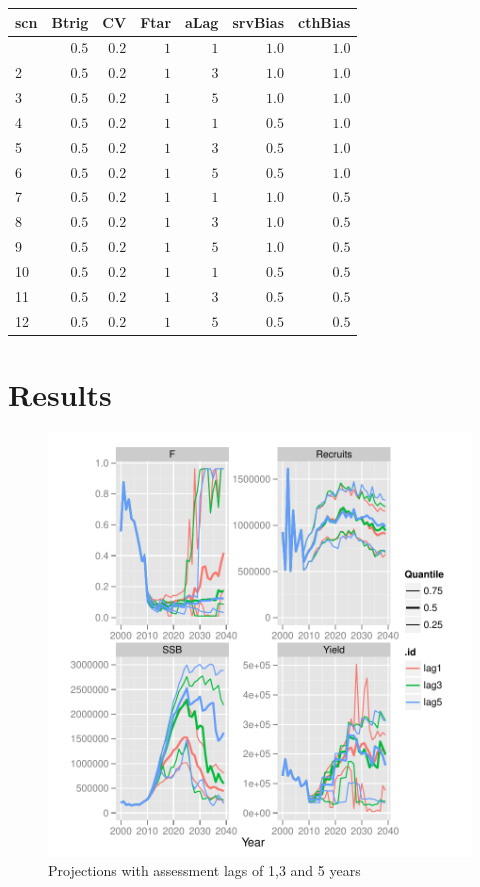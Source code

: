 \documentclass[a4paper]{article}
\begin{document}
\begin{table}[h]
\caption{Simulation scenarios}
%

\setlongtables


\begin{longtable}{lrrrrrr}
\hline
\multicolumn{1}{l}{scn}&\multicolumn{1}{c}{Btrig}&\multicolumn{1}{c}{CV}&\multicolumn{1}{c}{Ftar}&\multicolumn{1}{c}{aLag}&\multicolumn{1}{c}{srvBias}&\multicolumn{1}{c}{cthBias}\tabularnewline
\hline
\endhead
\hline
\endfoot
1&$0.5$&$0.2$&$1$&$1$&$1.0$&$1.0$\tabularnewline
2&$0.5$&$0.2$&$1$&$3$&$1.0$&$1.0$\tabularnewline
3&$0.5$&$0.2$&$1$&$5$&$1.0$&$1.0$\tabularnewline
4&$0.5$&$0.2$&$1$&$1$&$0.5$&$1.0$\tabularnewline
5&$0.5$&$0.2$&$1$&$3$&$0.5$&$1.0$\tabularnewline
6&$0.5$&$0.2$&$1$&$5$&$0.5$&$1.0$\tabularnewline
7&$0.5$&$0.2$&$1$&$1$&$1.0$&$0.5$\tabularnewline
8&$0.5$&$0.2$&$1$&$3$&$1.0$&$0.5$\tabularnewline
9&$0.5$&$0.2$&$1$&$5$&$1.0$&$0.5$\tabularnewline
10&$0.5$&$0.2$&$1$&$1$&$0.5$&$0.5$\tabularnewline
11&$0.5$&$0.2$&$1$&$3$&$0.5$&$0.5$\tabularnewline
12&$0.5$&$0.2$&$1$&$5$&$0.5$&$0.5$\tabularnewline
\hline
\end{longtable}\end{table}

\section{Results}

\begin{figure}[H]
\centering
\includegraphics{MSE-004}
\caption{Projections with assessment lags of 1,3 and 5 years}
\label{fig:lags}
\end{figure}
 
\end{document}
